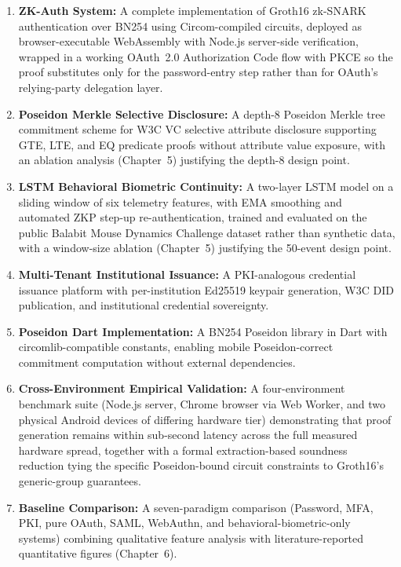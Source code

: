 \documentclass[12pt,a4paper,oneside]{report}
\begin{document}
\begin{enumerate}
  \item \textbf{ZK-Auth System:} A complete implementation of Groth16 zk-SNARK
        authentication over BN254 using Circom-compiled circuits, deployed as
        browser-executable WebAssembly with Node.js server-side verification,
        wrapped in a working OAuth~2.0 Authorization Code flow with PKCE so
        the proof substitutes only for the password-entry step rather than
        for OAuth's relying-party delegation layer.

  \item \textbf{Poseidon Merkle Selective Disclosure:} A depth-8 Poseidon Merkle
        tree commitment scheme for W3C VC selective attribute disclosure supporting
        GTE, LTE, and EQ predicate proofs without attribute value exposure, with
        an ablation analysis (Chapter~5) justifying the depth-8 design point.

  \item \textbf{LSTM Behavioral Biometric Continuity:} A two-layer LSTM model
        on a sliding window of six telemetry features, with EMA smoothing
        and automated ZKP step-up re-authentication, trained and evaluated on
        the public Balabit Mouse Dynamics Challenge dataset rather than
        synthetic data, with a window-size ablation (Chapter~5) justifying the
        50-event design point.

  \item \textbf{Multi-Tenant Institutional Issuance:} A PKI-analogous credential
        issuance platform with per-institution Ed25519 keypair generation, W3C DID
        publication, and institutional credential sovereignty.

  \item \textbf{Poseidon Dart Implementation:} A BN254 Poseidon library in Dart
        with circomlib-compatible constants, enabling mobile Poseidon-correct
        commitment computation without external dependencies.

  \item \textbf{Cross-Environment Empirical Validation:} A four-environment
        benchmark suite (Node.js server, Chrome browser via Web Worker, and
        two physical Android devices of differing hardware tier) demonstrating
        that proof generation remains within sub-second latency across the
        full measured hardware spread, together with a formal extraction-based
        soundness reduction tying the specific Poseidon-bound circuit
        constraints to Groth16's generic-group guarantees.

  \item \textbf{Baseline Comparison:} A seven-paradigm comparison (Password,
        MFA, PKI, pure OAuth, SAML, WebAuthn, and behavioral-biometric-only
        systems) combining qualitative feature analysis with
        literature-reported quantitative figures (Chapter~6).
\end{enumerate}
\end{document}
